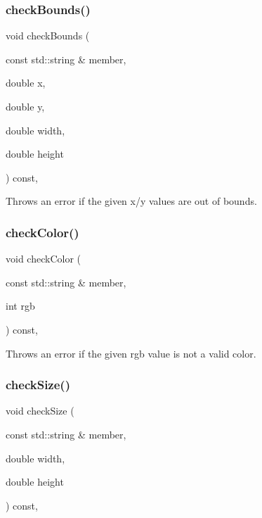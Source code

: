 \subsubsection{\texorpdfstring{check\+Bounds()}{checkBounds()}}
{\footnotesize\ttfamily void check\+Bounds (\begin{DoxyParamCaption}\item[{const std\+::string \&}]{member,  }\item[{double}]{x,  }\item[{double}]{y,  }\item[{double}]{width,  }\item[{double}]{height }\end{DoxyParamCaption}) const\hspace{0.3cm}{\ttfamily [protected]}, {\ttfamily [inherited]}}



Throws an error if the given x/y values are out of bounds. 

\mbox{\label{classGDrawingSurface_a9841b5dc607ca41a14819d80e1d8a09c}} 
\subsubsection{\texorpdfstring{check\+Color()}{checkColor()}}
{\footnotesize\ttfamily void check\+Color (\begin{DoxyParamCaption}\item[{const std\+::string \&}]{member,  }\item[{int}]{rgb }\end{DoxyParamCaption}) const\hspace{0.3cm}{\ttfamily [protected]}, {\ttfamily [inherited]}}



Throws an error if the given rgb value is not a valid color. 

\mbox{\label{classGDrawingSurface_a70a6546707ae708573396616bd0f5320}} 
\subsubsection{\texorpdfstring{check\+Size()}{checkSize()}}
{\footnotesize\ttfamily void check\+Size (\begin{DoxyParamCaption}\item[{const std\+::string \&}]{member,  }\item[{double}]{width,  }\item[{double}]{height }\end{DoxyParamCaption}) const\hspace{0.3cm}{\ttfamily [protected]}, {\ttfamily [inherited]}}



